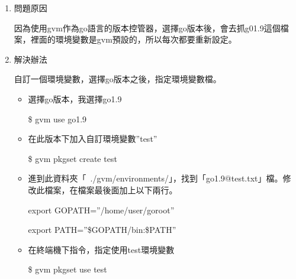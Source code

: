 


\begin{enumerate}
\item 問題原因

因為使用gvm作為go語言的版本控管器，選擇go版本後，會去抓g01.9這個檔案，裡面的環境變數是gvm預設的，所以每次都要重新設定。

\item 解決辦法

自訂一個環境變數，選擇go版本之後，指定環境變數檔。
	\begin{itemize}
	\item 選擇go版本，我選擇go1.9
	
	\colorbox{mygray}{\$ gvm use go1.9}

	\item 在此版本下加入自訂環境變數”test”
	
	\colorbox{mygray}{\$ gvm pkgset create test}
	\item 進到此資料夾「~./gvm/environments/」，找到「go1.9@test.txt」檔。修改此檔案，在檔案最後面加上以下兩行。
	
	\colorbox{mygray}{export GOPATH=”/home/user/goroot”}
	
	\colorbox{mygray}{export PATH=”\$GOPATH/bin:\$PATH”}
	\item 在終端機下指令，指定使用test環境變數
	
	\colorbox{mygray}{\$ gvm pkgset use test}
	\end{itemize}
\end{enumerate}

